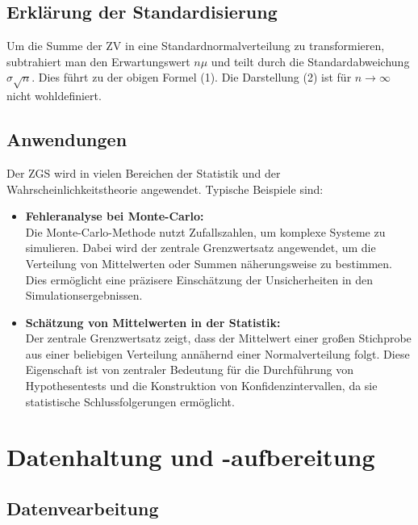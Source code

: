 \documentclass[a4paper,12pt]{article}
\begin{document}
\subsection{Erklärung der Standardisierung}

Um die Summe der ZV in eine Standardnormalverteilung zu transformieren, subtrahiert man den Erwartungswert $n\mu$ und teilt durch die Standardabweichung $\sigma\sqrt{n}$. Dies führt zu der obigen Formel (1). Die Darstellung (2) ist für $n \to \infty$ nicht wohldefiniert.

\subsection{Anwendungen}

Der ZGS wird in vielen Bereichen der Statistik und der Wahrscheinlichkeitstheorie angewendet. Typische Beispiele sind:
\begin{itemize}
    \item \textbf{Fehleranalyse bei Monte-Carlo:} \\Die Monte-Carlo-Methode nutzt Zufallszahlen, um komplexe Systeme zu simulieren. Dabei wird der zentrale Grenzwertsatz angewendet, um die Verteilung von Mittelwerten oder Summen näherungsweise zu bestimmen. Dies ermöglicht eine präzisere Einschätzung der Unsicherheiten in den Simulationsergebnissen.
    
    \item \textbf{Schätzung von Mittelwerten in der Statistik:} \\Der zentrale Grenzwertsatz zeigt, dass der Mittelwert einer großen Stichprobe aus einer beliebigen Verteilung annähernd einer Normalverteilung folgt.  Diese Eigenschaft ist von zentraler Bedeutung für die Durchführung von Hypothesentests und die Konstruktion von Konfidenzintervallen, da sie statistische Schlussfolgerungen ermöglicht.
\end{itemize}

\section{Datenhaltung und -aufbereitung}


\subsection{Datenvearbeitung}
\end{document}
